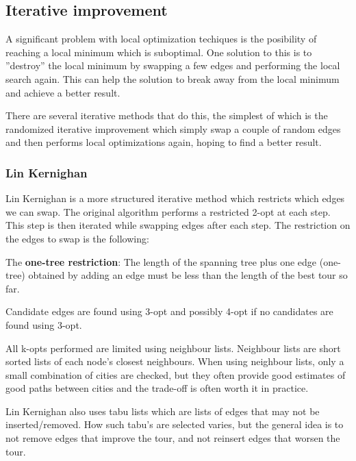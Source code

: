 \documentclass[paper=a4, fontsize=11pt,numbers=endperiod]{scrartcl} %
\numberwithin{equation}{section} %
\numberwithin{figure}{section} %
\numberwithin{table}{section} %
\begin{document}


\subsection{Iterative improvement}
A significant problem with local optimization techiques is the posibility of reaching a local minimum which is suboptimal.
One solution to this is to ''destroy'' the local minimum by swapping a few edges and performing the local search again.
This can help the solution to break away from the local minimum and achieve a better result.

There are several iterative methods that do this, the simplest of which is the randomized iterative improvement which simply swap a couple of random edges and then performs local optimizations again, hoping to find a better result.

\subsubsection{Lin Kernighan}
Lin Kernighan \cite{LK} is a more structured iterative method which restricts which edges we can swap. 
The original algorithm performs a restricted 2-opt at each step. This step is then iterated while swapping edges after each step. The restriction on the edges to swap is the following:

The \textbf{one-tree restriction}:
The length of the spanning tree plus one edge (one-tree) obtained by adding an edge must be less than the length of the best tour so far. \cite{LK2}

Candidate edges are found using 3-opt and possibly 4-opt if no candidates are found using 3-opt.

All k-opts performed are limited using neighbour lists. Neighbour lists are short sorted lists of each node's closest neighbours. When using neighbour lists, only a small combination of cities are checked, but they often provide good estimates of good paths between cities and the trade-off is often worth it in practice.

Lin Kernighan also uses tabu lists which are lists of edges that may not be inserted/removed. How such tabu's are selected varies, but the general idea is to not remove edges that improve the tour, and not reinsert edges that worsen the tour.




\end{document}
